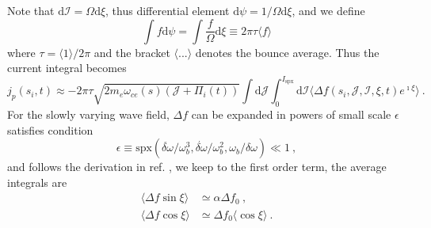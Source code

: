 Note that $\mathrm{d}\mathcal{I} = \Omega \mathrm{d}\xi$, thus differential element $\mathrm{d}\psi = 1/\Omega \mathrm{d}\xi$, and we define
\begin{equation}
      \int f \mathrm{d}\psi = \int \frac{f}{\Omega}\mathrm{d}\xi \equiv {2\pi \tau} \langle f \rangle
\end{equation}
where $\tau = \langle 1 \rangle/2\pi$ and the bracket $\langle ... \rangle$ denotes the bounce average.
Thus the current integral becomes
\begin{equation}
    j_p(s_i,t) \approx -  {2\pi \tau} \sqrt{2m_e\omega_{ce}(s)(\mathcal{J} + \Pi_i(t))}\int\mathrm{d} \mathcal{J} \int_0^{I_{\mathrm{s p x}}}\mathrm{d}\mathcal{I}  \langle \Delta f(s_i,\mathcal{J},\mathcal{I},\xi,t)e^{\imath \xi} \rangle  ~.
\end{equation}
For the slowly varying wave field, $\Delta f$ can be expanded in powers of small scale $\epsilon$ satisfies condition \cite{berk1999}
\begin{equation}
    \epsilon \equiv \mathrm{s p x}\left(\ddot{\delta \omega}/\omega_b^3, \dot{\delta \omega}/\omega_b^2, \omega_b/\delta \omega \right) \ll 1~,
\end{equation}
and follows the derivation in ref. \cite{berk1999}, we keep to the first order term, the average integrals are
\begin{equation}
    \begin{aligned}
    \langle\Delta f \sin \xi \rangle &\simeq \alpha \Delta f_0 ~, \\ 
    \langle \Delta f \cos \xi \rangle &\simeq  \Delta f_0 \langle \cos \xi \rangle ~.
    \end{aligned}
\end{equation}
